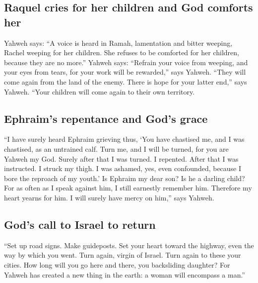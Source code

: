 \hypertarget{raquel-cries-for-her-children-and-god-comforts-her}{%
\subsection{Raquel cries for her children and God comforts
her}\label{raquel-cries-for-her-children-and-god-comforts-her}}

 Yahweh says: ``A voice is heard in Ramah, lamentation
and bitter weeping, Rachel weeping for her children. She refuses to be
comforted for her children, because they are no more.'' 
Yahweh says: ``Refrain your voice from weeping, and your eyes from
tears, for your work will be rewarded,'' says Yahweh. ``They will come
again from the land of the enemy.  There is hope for your
latter end,'' says Yahweh. ``Your children will come again to their own
territory.

\hypertarget{ephraims-repentance-and-gods-grace}{%
\subsection{Ephraim's repentance and God's
grace}\label{ephraims-repentance-and-gods-grace}}

 ``I have surely heard Ephraim grieving thus, `You have
chastised me, and I was chastised, as an untrained calf. Turn me, and I
will be turned, for you are Yahweh my God.  Surely after
that I was turned. I repented. After that I was instructed. I struck my
thigh. I was ashamed, yes, even confounded, because I bore the reproach
of my youth.'  Is Ephraim my dear son? Is he a darling
child? For as often as I speak against him, I still earnestly remember
him. Therefore my heart yearns for him. I will surely have mercy on
him,'' says Yahweh.

\hypertarget{gods-call-to-israel-to-return}{%
\subsection{God's call to Israel to
return}\label{gods-call-to-israel-to-return}}

 ``Set up road signs. Make guideposts. Set your heart
toward the highway, even the way by which you went. Turn again, virgin
of Israel. Turn again to these your cities.  How long
will you go here and there, you backsliding daughter? For Yahweh has
created a new thing in the earth: a woman will encompass a man.''

